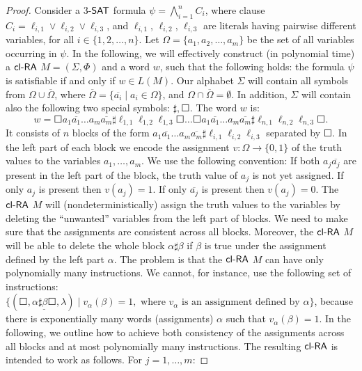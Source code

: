 \begin{proof}
Consider a $3$-$\textup{\sf SAT}$ formula $\psi = \bigwedge_{i=1}^n C_i$, where clause $C_i = \ell_{i,1} \vee \ell_{i,2} \vee \ell_{i,3}$, and $\ell_{i,1}$, $\ell_{i,2}$, $\ell_{i,3}$ are literals having pairwise different variables, for all $i \in \{1, 2, \ldots, n\}$. Let $\Omega = \{a_1, a_2, \ldots, a_m\}$ be the set of all variables occurring in $\psi$. In the following, we will effectively construct (in polynomial time) a $\mbox{\sf cl-RA\/}$ $M = (\Sigma, \Phi)$ and a word $w$, such that the following holds: the formula $\psi$ is satisfiable if and only if $w \in L(M)$. Our alphabet $\Sigma$ will contain all symbols from $\Omega \cup \overline{\Omega}$, where $\overline{\Omega} = \{ \overline{a_i} \mid a_i \in \Omega \}$, and $\Omega \cap \overline{\Omega} = \emptyset$. In addition, $\Sigma$ will contain also the following two special symbols: $\sharp, \Square$. The word $w$ is:
$$w = \Square a_1 \overline{a_1} \ldots a_m \overline{a_m} \sharp \ell_{1,1} \ell_{1,2} \ell_{1,3} \Square \ldots \Square a_1 \overline{a_1} \ldots a_m \overline{a_m} \sharp \ell_{n,1} \ell_{n,2} \ell_{n,3} \Square.$$
It consists of $n$ blocks of the form $a_1 \overline{a_1} \ldots a_m \overline{a_m} \sharp \ell_{i,1} \ell_{i,2} \ell_{i,3}$ separated by $\Square$. In the left part of each block we encode the assignment $v: \Omega \to \{0, 1\}$ of the truth values to the variables $a_1, \ldots, a_m$. We use the following convention: If both $a_j \overline{a_j}$ are present in the left part of the block, the truth value of $a_j$ is not yet assigned. If only $a_j$ is present then $v(a_j) = 1$. If only $\overline{a_j}$ is present then $v(a_j) = 0$. The $\mbox{\sf cl-RA\/}$ $M$ will (nondeterministically) assign the truth values to the variables by deleting the ``unwanted'' variables from the left part of blocks. We need to make sure that the assignments are consistent across all blocks. Moreover, the $\mbox{\sf cl-RA\/}$ $M$ will be able to delete the whole block $\alpha \sharp \beta$ if $\beta$ is true under the assignment defined by the left part $\alpha$. The problem is that the $\mbox{\sf cl-RA\/}$ $M$ can have only polynomially many instructions. We cannot, for instance, use the following set of instructions: $\{ (\Square, \underline{\alpha \sharp \beta \Square}, \lambda) \mid v_{\alpha}(\beta) = 1, \text{ where } v_{\alpha} \text{ is an assignment defined by } \alpha\}$, because there is exponentially many words (assignments) $\alpha$ such that $v_{\alpha}(\beta) = 1$. In the following, we outline how to achieve both consistency of the assignments across all blocks and at most polynomially many instructions. The resulting $\mbox{\sf cl-RA\/}$ is intended to work as follows. For $j = 1, \ldots, m$:

\end{proof}
